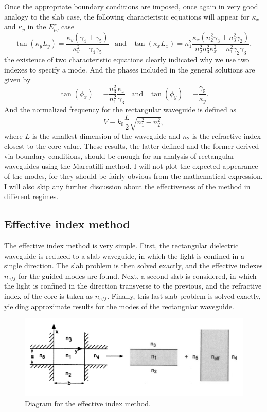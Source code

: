 Once the appropriate boundary conditions are imposed, once again in very good analogy to the slab case, the following characteristic equations will appear for $\kappa_x$ and $\kappa_y$ in the $E^x_{pq}$ case
\begin{equation}
    \tan(\kappa_yL_y)=\frac{\kappa_y(\gamma_4+\gamma_5)}{\kappa_y^2-\gamma_4\gamma_5}\;\;\;\text{and}\;\;\;\tan(\kappa_xL_x)=n_1^2\frac{\kappa_x(n_2^2\gamma_3+n_3^2\gamma_2)}{n_2^2n_3^2\kappa_x^2-n_1^2\gamma_2\gamma_3},
\end{equation}
the existence of two characteristic equations clearly indicated why we use two indexes to specify a mode. And the phases included in the general solutions are given by
\begin{equation}
    \tan(\phi_x)=-\frac{n_3^2}{n_1^2}\frac{\kappa_x}{\gamma_3}\;\;\;\text{and}\;\;\;\tan(\phi_y)=-\frac{\gamma_5}{\kappa_y}.
\end{equation}
And the normalized frequency for the rectangular waveguide is defined as
\begin{equation}
    V\equiv k_0\frac{L}{2}\sqrt{n_1^2-n_2^2},
\end{equation}
where $L$ is the smallest dimension of the waveguide and $n_2$ is the refractive index closest to the core value. These results, the latter defined and the former derived via boundary conditions, should be enough for an analysis of rectangular waveguides using the Marcatilli method. I will not plot the expected appearance of the modes, for they should be fairly obvious from the mathematical expression. I will also skip any further discussion about the effectiveness of the method in different regimes.

\subsection{Effective index method}

The effective index method is very simple. First, the rectangular dielectric waveguide is reduced to a slab waveguide, in which the light is confined in a single direction. The slab problem is then solved exactly, and the effective indexes $n_{eff}$ for the guided modes are found. Next, a second slab is considered, in which the light is confined in the direction transverse to the previous, and the refractive index of the core is taken as $n_{eff}$. Finally, this last slab problem is solved exactly, yielding approximate results for the modes of the rectangular waveguide.

\begin{figure}[h]
    \centering
    \includegraphics[width=0.8\linewidth]{Figuras/effective index method.png}
    \caption{Diagram for the effective index method.}
    \label{fig:effective.index.method}
\end{figure}

